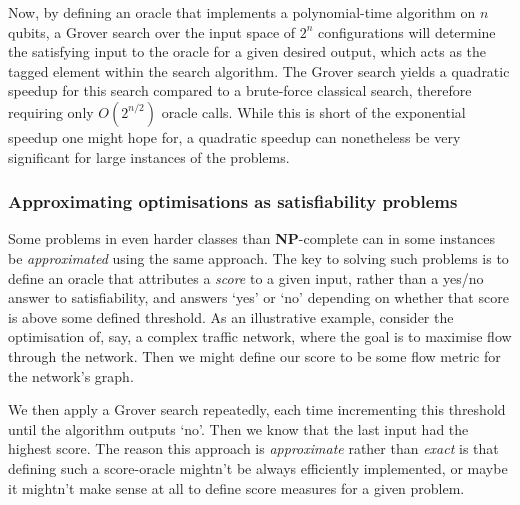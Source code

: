 Now, by defining an oracle that implements a polynomial-time algorithm on $n$ qubits, a Grover search over the input space of $2^n$ configurations will determine the satisfying input to the oracle for a given desired output, which acts as the tagged element within the search algorithm. The Grover search yields a quadratic speedup for this search compared to a brute-force classical search, therefore requiring only $O(2^{n/2})$ oracle calls. While this is short of the exponential speedup one might hope for, a quadratic speedup can nonetheless be very significant for large instances of the problems.

\subsubsection{Approximating optimisations as satisfiability problems}

Some problems in even harder classes than \textbf{NP}-complete can in some instances be \textit{approximated} using the same approach. The key to solving such problems is to define an oracle that attributes a \textit{score} to a given input, rather than a yes/no answer to satisfiability, and answers `yes' or `no' depending on whether that score is above some defined threshold. As an illustrative example, consider the optimisation of, say, a complex traffic network, where the goal is to maximise flow through the network. Then we might define our score to be some flow metric for the network's graph.

We then apply a Grover search repeatedly, each time incrementing this threshold until the algorithm outputs `no'. Then we know that the last input had the highest score. The reason this approach is \textit{approximate} rather than \textit{exact} is that defining such a score-oracle mightn't be always efficiently implemented, or maybe it mightn't make sense at all to define score measures for a given problem.


